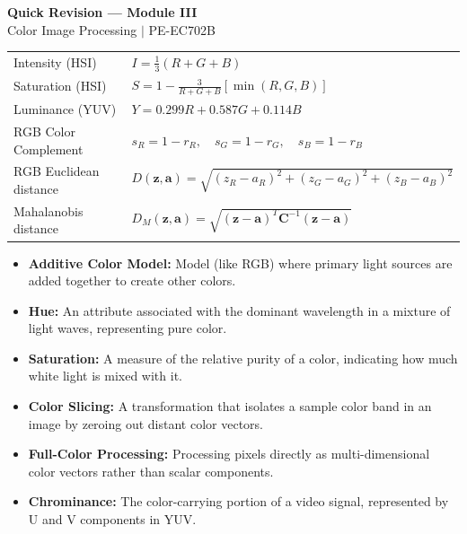 \documentclass[12pt,a4paper]{article}
\renewcommand{\arraystretch}{1.45}
\begin{document}
\newpage

\begin{center}
  {\large\bfseries\color{myred} Quick Revision --- Module III}\\[3pt]
  {\small\color{mydark} Color Image Processing $|$ PE-EC702B}
\end{center}
\noindent{\color{myred}\rule{\linewidth}{1.2pt}}
\vspace{4pt}

\begin{tcolorbox}[formulabox, title={\textbf{Key Formulas at a Glance}}]
\renewcommand{\arraystretch}{1.3}
\begin{tabularx}{\linewidth}{B{5.0cm} X}Intensity (HSI) & $I = \frac{1}{3}(R + G + B)$ \\
Saturation (HSI) & $S = 1 - \frac{3}{R + G + B} \left[ \min(R, G, B) \right]$ \\
Luminance (YUV) & $Y = 0.299R + 0.587G + 0.114B$ \\
RGB Color Complement & $s_R = 1 - r_R, \quad s_G = 1 - r_G, \quad s_B = 1 - r_B$ \\
RGB Euclidean distance & $D(\mathbf{z}, \mathbf{a}) = \sqrt{(z_R - a_R)^2 + (z_G - a_G)^2 + (z_B - a_B)^2}$ \\
Mahalanobis distance & $D_M(\mathbf{z}, \mathbf{a}) = \sqrt{(\mathbf{z} - \mathbf{a})^T \mathbf{C}^{-1} (\mathbf{z} - \mathbf{a})}$
\end{tabularx}
\end{tcolorbox}

\begin{tcolorbox}[defbox, title={\textbf{One-Line Definitions}}]
\begin{itemize}[leftmargin=*, itemsep=2.5pt, topsep=0pt]
  \item \textbf{Additive Color Model:} Model (like RGB) where primary light sources are added together to create other colors.
  \item \textbf{Hue:} An attribute associated with the dominant wavelength in a mixture of light waves, representing pure color.
  \item \textbf{Saturation:} A measure of the relative purity of a color, indicating how much white light is mixed with it.
  \item \textbf{Color Slicing:} A transformation that isolates a sample color band in an image by zeroing out distant color vectors.
  \item \textbf{Full-Color Processing:} Processing pixels directly as multi-dimensional color vectors rather than scalar components.
  \item \textbf{Chrominance:} The color-carrying portion of a video signal, represented by U and V components in YUV.
\end{itemize}
\end{tcolorbox}
\end{document}
